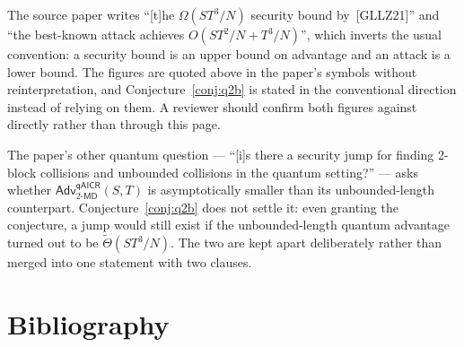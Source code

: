 \documentclass{aicr-conjecture}
\newcommand{\MD}{\mathsf{MD}}
\newcommand{\Adv}{\mathsf{Adv}}
\newcommand{\qaicr}{\mathsf{qAICR}}
\newcommand{\tTh}{\tilde{\Theta}}
\begin{document}
\begin{remark}\label{rem:notation}
The source paper writes ``[t]he $\Omega(ST^{3}/N)$ security bound
by~[GLLZ21]'' and ``the best-known attack achieves $O(ST^{2}/N +
T^{3}/N)$'', which inverts the usual convention: a security bound is an
upper bound on advantage and an attack is a lower bound. The figures
are quoted above in the paper's symbols without reinterpretation, and
Conjecture~\ref{conj:q2b} is stated in the conventional direction
instead of relying on them. A reviewer should confirm both figures
against~\cite{GLLZ21} directly rather than through this page.
\end{remark}

\begin{remark}\label{rem:jump}
The paper's other quantum question --- ``[i]s there a security jump for
finding 2-block collisions and unbounded collisions in the quantum
setting?'' --- asks whether
$\Adv^{\qaicr}_{2\text{-}\MD}(S,T)$ is asymptotically smaller than its
unbounded-length counterpart. Conjecture~\ref{conj:q2b} does not settle
it: even granting the conjecture, a jump would still exist if the
unbounded-length quantum advantage turned out to be $\tTh(ST^{3}/N)$.
The two are kept apart deliberately rather than merged into one
statement with two clauses.
\end{remark}

\section{Bibliography}
\end{document}
